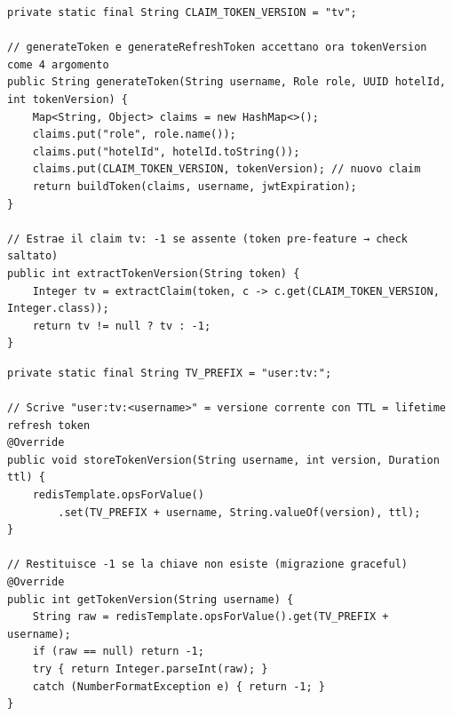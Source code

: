 ﻿\documentclass[a4paper,12pt]{report}
\begin{document}
\begin{securebox}[title={Codice Sicuro --- JwtService.java (claim tv nei JWT)}]
\begin{lstlisting}[style=java]
private static final String CLAIM_TOKEN_VERSION = "tv";

// generateToken e generateRefreshToken accettano ora tokenVersion come 4 argomento
public String generateToken(String username, Role role, UUID hotelId, int tokenVersion) {
    Map<String, Object> claims = new HashMap<>();
    claims.put("role", role.name());
    claims.put("hotelId", hotelId.toString());
    claims.put(CLAIM_TOKEN_VERSION, tokenVersion); // nuovo claim
    return buildToken(claims, username, jwtExpiration);
}

// Estrae il claim tv: -1 se assente (token pre-feature → check saltato)
public int extractTokenVersion(String token) {
    Integer tv = extractClaim(token, c -> c.get(CLAIM_TOKEN_VERSION, Integer.class));
    return tv != null ? tv : -1;
}
\end{lstlisting}
\end{securebox}

\begin{securebox}[title={Codice Sicuro --- RefreshTokenServiceImpl.java (Redis token version)}]
\begin{lstlisting}[style=java]
private static final String TV_PREFIX = "user:tv:";

// Scrive "user:tv:<username>" = versione corrente con TTL = lifetime refresh token
@Override
public void storeTokenVersion(String username, int version, Duration ttl) {
    redisTemplate.opsForValue()
        .set(TV_PREFIX + username, String.valueOf(version), ttl);
}

// Restituisce -1 se la chiave non esiste (migrazione graceful)
@Override
public int getTokenVersion(String username) {
    String raw = redisTemplate.opsForValue().get(TV_PREFIX + username);
    if (raw == null) return -1;
    try { return Integer.parseInt(raw); }
    catch (NumberFormatException e) { return -1; }
}
\end{lstlisting}
\end{securebox}
\end{document}
